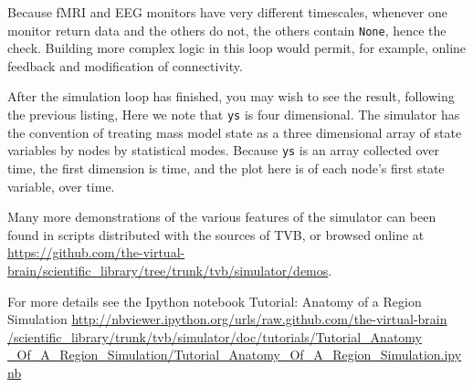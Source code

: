 \noindent Because fMRI and EEG monitors have very different
timescales, whenever one monitor return data and the others do
not, the others contain \texttt{None}, hence the check. Building
more complex logic in this loop would permit, for example, online
feedback and modification of connectivity. 

After the simulation loop has finished, you may wish to see the
result, following the previous listing, 
\noindent Here we note that \texttt{ys} is four dimensional. The 
simulator has the convention of treating  mass model state as a
three dimensional array of state variables by nodes by statistical
modes. Because \texttt{ys} is an array collected over time, the first
dimension is time, and the plot here is of each node's first state
variable, over time.

Many more demonstrations of the various features of the simulator
can been found in scripts distributed with the sources of TVB, or 
browsed online at \url{https://github.com/the-virtual-brain/scientific_library/tree/trunk/tvb/simulator/demos}.

For more details see the Ipython notebook Tutorial: Anatomy of a Region Simulation 
\url{http://nbviewer.ipython.org/urls/raw.github.com/the-virtual-brain
/scientific_library/trunk/tvb/simulator/doc/tutorials/Tutorial_Anatomy
_Of_A_Region_Simulation/Tutorial_Anatomy_Of_A_Region_Simulation.ipynb}


%
